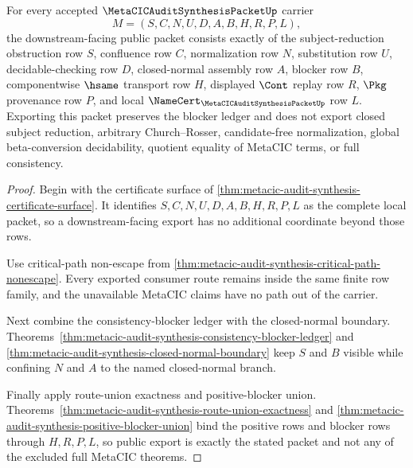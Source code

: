 \begin{theorem}
\label{thm:metacic-audit-synthesis-public-export}
For every accepted $\MetaCICAuditSynthesisPacketUp$ carrier
$$
M=(S,C,N,U,D,A,B,H,R,P,L),
$$
the downstream-facing public packet consists exactly of the subject-reduction obstruction row $S$, confluence row $C$, normalization row $N$, substitution row $U$, decidable-checking row $D$, closed-normal assembly row $A$, blocker row $B$, componentwise $\hsame$ transport row $H$, displayed $\Cont$ replay row $R$, $\Pkg$ provenance row $P$, and local $\NameCert_{\MetaCICAuditSynthesisPacketUp}$ row $L$. Exporting this packet preserves the blocker ledger and does not export closed subject reduction, arbitrary Church--Rosser, candidate-free normalization, global beta-conversion decidability, quotient equality of MetaCIC terms, or full consistency.
\end{theorem}
\begin{proof}
Begin with the certificate surface of \autoref{thm:metacic-audit-synthesis-certificate-surface}. It identifies $S,C,N,U,D,A,B,H,R,P,L$ as the complete local packet, so a downstream-facing export has no additional coordinate beyond those rows.

Use critical-path non-escape from \autoref{thm:metacic-audit-synthesis-critical-path-nonescape}. Every exported consumer route remains inside the same finite row family, and the unavailable MetaCIC claims have no path out of the carrier.

Next combine the consistency-blocker ledger with the closed-normal boundary. Theorems~\ref{thm:metacic-audit-synthesis-consistency-blocker-ledger} and \ref{thm:metacic-audit-synthesis-closed-normal-boundary} keep $S$ and $B$ visible while confining $N$ and $A$ to the named closed-normal branch.

Finally apply route-union exactness and positive-blocker union. Theorems~\ref{thm:metacic-audit-synthesis-route-union-exactness} and \ref{thm:metacic-audit-synthesis-positive-blocker-union} bind the positive rows and blocker rows through $H,R,P,L$, so public export is exactly the stated packet and not any of the excluded full MetaCIC theorems.
\end{proof}

